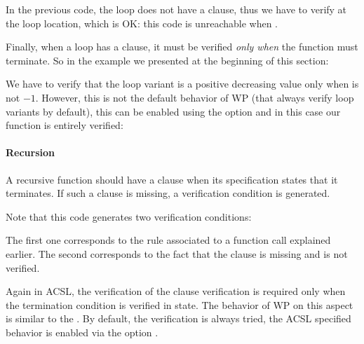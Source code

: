 


In the previous code, the loop does not have a 
clause, thus we have to verify 
at the loop location, which is OK: this code is unreachable when
.



Finally, when a loop has a  clause, it must be
verified {\em only when} the function must terminate. So in the example
we presented at the beginning of this section:




We have to verify that the loop variant is a positive decreasing value only
when  is not $-1$. However, this is not the default
behavior of WP (that always verify loop variants by default), this can
be enabled using the option  and
in this case our function is entirely verified:




\paragraph{Recursion}


A recursive function should have a  clause when its
specification states that it terminates. If such a clause is missing, a
verification condition  is generated.




Note that this code generates two verification conditions:




The first one corresponds to the rule associated to a function call explained
earlier. The second corresponds to the fact that the 
clause is missing and is not verified.


Again in ACSL, the verification of the  clause
verification is required only when the termination condition is verified in
 state. The behavior of WP on this aspect is similar to the
. By default, the verification is always tried, the
ACSL specified behavior is enabled via the option
.


